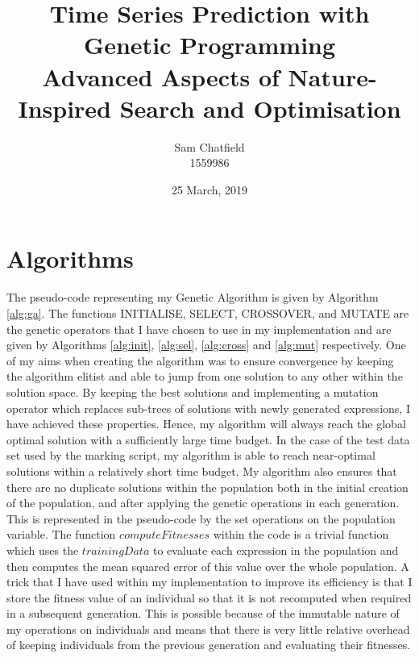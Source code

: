 \documentclass[11pt]{article}
\title{
  Time Series Prediction with Genetic Programming\\
  \large Advanced Aspects of Nature-Inspired Search and Optimisation
}
\author{
  Sam Chatfield\\
  1559986
}
\date{25 March, 2019}
\begin{document}
\maketitle

\section{Algorithms}

The pseudo-code representing my Genetic Algorithm is given by Algorithm \ref{alg:ga}.
The functions INITIALISE, SELECT, CROSSOVER, and MUTATE are the genetic operators that I have chosen to use in my implementation and are given by Algorithms \ref{alg:init}, \ref{alg:sel}, \ref{alg:cross} and \ref{alg:mut} respectively.
One of my aims when creating the algorithm was to ensure convergence by keeping the algorithm elitist and able to jump from one solution to any other within the solution space.
By keeping the best solutions and implementing a mutation operator which replaces sub-trees of solutions with newly generated expressions, I have achieved these properties.
Hence, my algorithm will always reach the global optimal solution with a sufficiently large time budget.
In the case of the test data set used by the marking script, my algorithm is able to reach near-optimal solutions within a relatively short time budget.
My algorithm also ensures that there are no duplicate solutions within the population both in the initial creation of the population, and after applying the genetic operations in each generation.
This is represented in the pseudo-code by the set operations on the population variable.
The function $computeFitnesses$ within the code is a trivial function which uses the $trainingData$ to evaluate each expression in the population and then computes the mean squared error of this value over the whole population.
A trick that I have used within my implementation to improve its efficiency is that I store the fitness value of an individual so that it is not recomputed when required in a subsequent generation.
This is possible because of the immutable nature of my operations on individuals and means that there is very little relative overhead of keeping individuals from the previous generation and evaluating their fitnesses.
\end{document}
